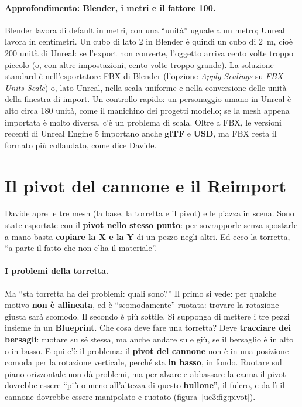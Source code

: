 \paragraph{Approfondimento: Blender, i metri e il fattore 100.} Blender lavora di default
in metri, con una ``unità'' uguale a un metro; Unreal lavora in centimetri. Un cubo di
lato 2 in Blender è quindi un cubo di 2~m, cioè 200 unità di Unreal: se l'export non
converte, l'oggetto arriva cento volte troppo piccolo (o, con altre impostazioni, cento
volte troppo grande). La soluzione standard è nell'esportatore FBX di Blender
(l'opzione \emph{Apply Scalings} su \emph{FBX Units Scale}) o, lato Unreal, nella
scala uniforme e nella conversione delle unità della finestra di import. Un controllo
rapido: un personaggio umano in Unreal è alto circa 180 unità, come il manichino dei
progetti modello; se la mesh appena importata è molto diversa, c'è un problema di scala.
Oltre a FBX, le versioni recenti di Unreal Engine 5 importano anche \textbf{glTF} e
\textbf{USD}, ma FBX resta il formato più collaudato, come dice Davide.

\section{Il pivot del cannone e il Reimport}
\label{ue3:sec:pivot}

Davide apre le tre mesh (la base, la torretta e il pivot) e le piazza in scena. Sono
state esportate con il \textbf{pivot nello stesso punto}: per sovrapporle senza
spostarle a mano basta \textbf{copiare la X e la Y} di un pezzo negli altri. Ed ecco la
torretta, ``a parte il fatto che non c'ha il materiale''.

\paragraph{I problemi della torretta.} Ma ``sta torretta ha dei problemi: quali sono?''
Il primo si vede: per qualche motivo \textbf{non è allineata}, ed è ``scomodamente''
ruotata: trovare la rotazione giusta sarà scomodo. Il secondo è più sottile. Si
supponga di mettere i tre pezzi insieme in un \textbf{Blueprint}. Che cosa deve fare una
torretta? Deve \textbf{tracciare dei bersagli}: ruotare su sé stessa, ma anche andare su
e giù, se il bersaglio è in alto o in basso. E qui c'è il problema: il \textbf{pivot del
cannone} non è in una posizione comoda per la rotazione verticale, perché sta
\textbf{in basso}, in fondo. Ruotare sul piano orizzontale non dà problemi, ma per
alzare e abbassare la canna il pivot dovrebbe essere ``più o meno all'altezza di questo
\textbf{bullone}'', il fulcro, e da lì il cannone dovrebbe essere manipolato e ruotato
(figura~\ref{ue3:fig:pivot}).

